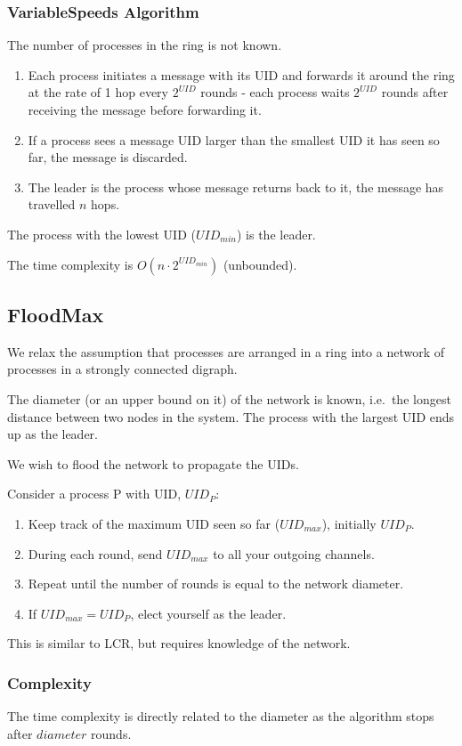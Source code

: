 \documentclass[11pt]{article}
\begin{document}
\subsubsection{VariableSpeeds Algorithm}
The number of processes in the ring is not known.
\begin{enumerate}
  \item Each process initiates a message with its UID and forwards it around the ring at the rate of 1 hop every $2^{UID}$ rounds - each process waits $2^{UID}$ rounds after receiving the message before forwarding it.
  \item If a process sees a message UID larger than the smallest UID it has seen so far, the message is discarded.
  \item The leader is the process whose message returns back to it, the message has travelled $n$ hops.
\end{enumerate}
The process with the lowest UID ($UID_{min}$) is the leader.

The time complexity is $O(n \cdot 2^{UID_{min}})$ (unbounded).

\subsection{FloodMax}
We relax the assumption that processes are arranged in a ring into a network of processes in a strongly connected digraph.

The diameter (or an upper bound on it) of the network is known, i.e.\ the longest distance between two nodes in the system.
The process with the largest UID ends up as the leader.

We wish to flood the network to propagate the UIDs.

Consider a process P with UID, $UID_P$:
\begin{enumerate}
  \item Keep track of the maximum UID seen so far ($UID_{max}$), initially $UID_P$.
  \item During each round, send $UID_{max}$ to all your outgoing channels.
  \item Repeat until the number of rounds is equal to the network diameter.
  \item If $UID_{max} = UID_P$, elect yourself as the leader.
\end{enumerate}
This is similar to LCR, but requires knowledge of the network.

\subsubsection{Complexity}
The time complexity is directly related to the diameter as the algorithm stops after $diameter$ rounds.
\end{document}
